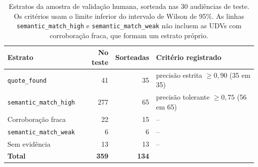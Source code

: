 \begin{table}[!htb]
  \centering
  \caption{Estratos da amostra de validação humana, sorteada nas 30 audiências de teste. Os critérios
  usam o limite inferior do intervalo de Wilson de 95\%. As linhas \texttt{semantic\_match\_high} e
  \texttt{semantic\_match\_weak} não incluem as UDVs com corroboração fraca, que formam um estrato próprio.}
  \label{tab:amostra}
  \small
  \begin{tabularx}{\textwidth}{@{}Xrrl@{}}
    \toprule
    \textbf{Estrato} & \textbf{No teste} & \textbf{Sorteadas} & \textbf{Critério registrado} \\
    \midrule
    \texttt{quote\_found}                                   &  41 &  35 & precisão estrita $\geq 0{,}90$ (35 em 35) \\
    \texttt{semantic\_match\_high}                          & 277 &  65 & precisão tolerante $\geq 0{,}75$ (56 em 65) \\
    Corroboração fraca                                      &  22 &  15 & -- \\
    \texttt{semantic\_match\_weak}                          &   6 &   6 & -- \\
    Sem evidência                                           &  13 &  13 & -- \\
    \midrule
    \textbf{Total}                                          & \textbf{359} & \textbf{134} & \\
    \bottomrule
  \end{tabularx}
\end{table}
